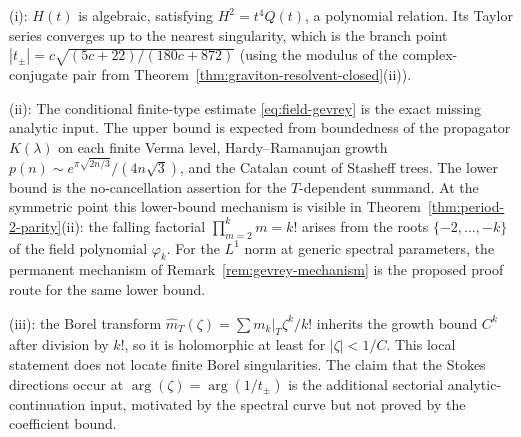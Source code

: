 \begin{remark}[Evidence]
(i): $H(t)$ is algebraic, satisfying $H^2 = t^4 Q(t)$, a
polynomial relation. Its Taylor series converges up to the
nearest singularity, which is the branch point
$|t_\pm| = c\sqrt{(5c+22)/(180c+872)}$ (using the modulus of the
complex-conjugate pair from
Theorem~\ref{thm:graviton-resolvent-closed}(ii)).

(ii): The conditional finite-type estimate
\eqref{eq:field-gevrey} is the exact missing analytic input. The upper
bound is expected from boundedness of the propagator \(K(\lambda)\) on
each finite Verma level, Hardy--Ramanujan growth
\(p(n)\sim e^{\pi\sqrt{2n/3}}/(4n\sqrt3)\), and the Catalan count of
Stasheff trees. The lower bound is the no-cancellation assertion for
the \(T\)-dependent summand. At the symmetric point this lower-bound
mechanism is visible in Theorem~\ref{thm:period-2-parity}(ii): the
falling factorial \(\prod_{m=2}^k m=k!\) arises from the roots
\(\{-2,\ldots,-k\}\) of the field polynomial \(\varphi_k\). For the
\(L^1\) norm at generic spectral parameters, the permanent mechanism
of Remark~\ref{rem:gevrey-mechanism} is the proposed proof route for
the same lower bound.

(iii): the Borel transform $\hat m_T(\zeta) = \sum m_k|_T
\zeta^k/k!$ inherits the growth bound \(C^k\) after division by
\(k!\), so it is holomorphic at least for \(|\zeta|<1/C\). This
local statement does not locate finite Borel singularities. The
claim that the Stokes directions occur at
\(\arg(\zeta)=\arg(1/t_\pm)\) is the additional sectorial
analytic-continuation input, motivated by the spectral curve but not
proved by the coefficient bound.
\end{remark}

